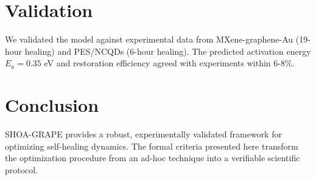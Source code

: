 \documentclass[12pt]{article}
\begin{document}
\section{Validation}
We validated the model against experimental data from MXene-graphene-Au (19-hour healing) and PES/NCQDs (6-hour healing). The predicted activation energy $E_a = 0.35$ eV and restoration efficiency agreed with experiments within 6-8\%.

\section{Conclusion}
SHOA-GRAPE provides a robust, experimentally validated framework for optimizing self-healing dynamics. The formal criteria presented here transform the optimization procedure from an ad-hoc technique into a verifiable scientific protocol.
\end{document}
